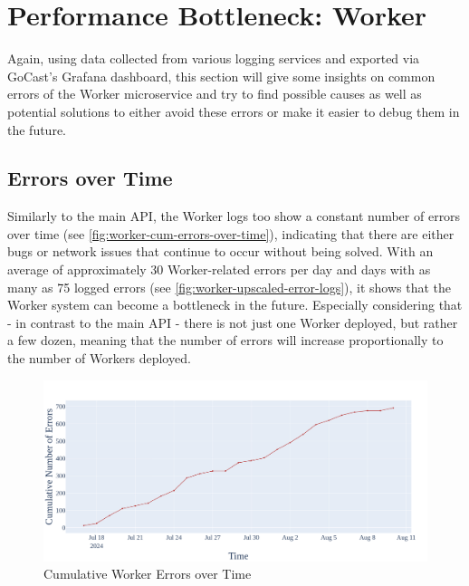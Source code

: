 
\section{Performance Bottleneck: Worker}

Again, using data collected from various logging services and exported via GoCast's Grafana dashboard, this section will give some insights on common errors of the Worker microservice and try to find possible causes as well as potential solutions to either avoid these errors or make it easier to debug them in the future.  

\subsection{Errors over Time}

Similarly to the main \ac{API}, the Worker logs too show a constant number of errors over time (see \autoref{fig:worker-cum-errors-over-time}), indicating that there are either bugs or network issues that continue to occur without being solved. With an average of approximately 30 Worker-related errors per day and days with as many as 75 logged errors (see \autoref{fig:worker-upscaled-error-logs}), it shows that the Worker system can become a bottleneck in the future. Especially considering that - in contrast to the main \ac{API} - there is not just one Worker deployed, but rather a few dozen, meaning that the number of errors will increase proportionally to the number of Workers deployed. 

\begin{figure}[htpb]
    \centering
    \includegraphics[width=\linewidth]{images/plots/worker/cum_errors_over_time.png}
    \caption[Cumulative Worker Errors over Time]{Cumulative Worker Errors over Time}\label{fig:worker-cum-errors-over-time}
\end{figure}

